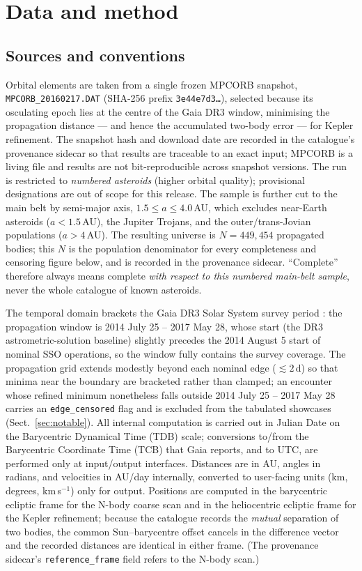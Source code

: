 \documentclass{aa}
\begin{document}
\section{Data and method}
\label{sec:method}

\subsection{Sources and conventions}
\label{sec:sources}

Orbital elements are taken from a single frozen MPCORB snapshot,
\texttt{MPCORB\_20160217.DAT} (SHA-256 prefix \texttt{3e44e7d3\ldots}), selected
because its osculating epoch lies at the centre of the Gaia DR3 window,
minimising the propagation distance --- and hence the accumulated two-body
error --- for Kepler refinement. The snapshot hash and download date are
recorded in the catalogue's provenance sidecar so that results are traceable to
an exact input; MPCORB is a living file and results are not bit-reproducible
across snapshot versions. The run is restricted to \emph{numbered asteroids}
(higher orbital quality); provisional designations are out of scope for this
release. The sample is further cut to the main belt by semi-major axis,
$1.5 \le a \le 4.0$\,AU, which excludes near-Earth asteroids ($a<1.5$\,AU),
the Jupiter Trojans, and the outer/trans-Jovian populations ($a>4$\,AU). The
resulting universe is $N = 449{,}454$ propagated bodies; this $N$ is the
population denominator for every completeness and censoring figure below, and is
recorded in the provenance sidecar. ``Complete'' therefore always means complete
\emph{with respect to this numbered main-belt sample}, never the whole catalogue
of known asteroids.

The temporal domain brackets the Gaia DR3 Solar System survey period
\citep{tanga2023}: the propagation window is 2014 July 25 -- 2017 May 28, whose
start (the DR3 astrometric-solution baseline) slightly precedes the 2014 August 5
start of nominal SSO operations, so the window fully contains the survey coverage.
The propagation grid extends modestly beyond each nominal edge ($\lesssim2$\,d) so
that minima near the boundary are bracketed rather than clamped; an encounter
whose refined minimum nonetheless falls outside 2014 July 25 -- 2017 May 28 carries
an \texttt{edge\_censored} flag and is excluded from the tabulated showcases
(Sect.~\ref{sec:notable}).
All internal computation is
carried out in Julian Date on the Barycentric Dynamical Time (TDB) scale;
conversions to/from the Barycentric Coordinate Time (TCB) that Gaia reports,
and to UTC, are performed only at input/output interfaces. Distances are in AU,
angles in radians, and velocities in AU/day internally, converted to
user-facing units (km, degrees, km\,s$^{-1}$) only for output. Positions are
computed in the barycentric ecliptic frame for the N-body coarse scan and in the
heliocentric ecliptic frame for the Kepler refinement; because the catalogue
records the \emph{mutual} separation of two bodies, the common Sun--barycentre
offset cancels in the difference vector and the recorded distances are identical
in either frame. (The provenance sidecar's \texttt{reference\_frame} field refers
to the N-body scan.)
\end{document}
